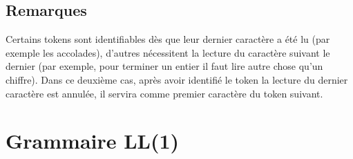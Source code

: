 \documentclass[a4paper,10pt]{article}
\begin{document}
	\subsection{Remarques}
		Certains tokens sont identifiables dès que leur dernier caractère a été lu (par exemple les accolades), 
		d'autres nécessitent la lecture du caractère suivant le dernier (par exemple, pour terminer un entier il faut lire autre chose qu'un chiffre).
		Dans ce deuxième cas, après avoir identifié le token la lecture du dernier caractère est annulée, il servira comme premier caractère du token suivant.

\section{Grammaire LL(1)}

\setcounter{cnt}{1}

\newcommand{\varname}[1]{\begin{math}\langle\end{math}#1\begin{math}\rangle\end{math}}
\newcommand{\num}{\begin{math}[\thecnt]\end{math}\addtocounter{cnt}{1}}
\end{document}
